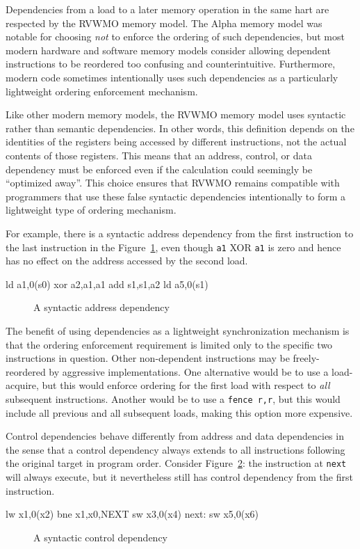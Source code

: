 Dependencies from a load to a later memory operation in the same hart are respected by the RVWMO memory model.
The Alpha memory model was notable for choosing {\em not} to enforce the ordering of such dependencies, but most modern hardware and software memory models consider allowing dependent instructions to be reordered too confusing and counterintuitive.
Furthermore, modern code sometimes intentionally uses such dependencies as a particularly lightweight ordering enforcement mechanism.

Like other modern memory models, the RVWMO memory model uses syntactic rather than semantic dependencies.
In other words, this definition depends on the identities of the
registers being accessed by different instructions, not the actual
contents of those registers.  This means that an address, control, or
data dependency must be enforced even if the calculation could seemingly
be ``optimized away''.
This choice ensures that RVWMO remains compatible with programmers that use these false syntactic dependencies intentionally to form a lightweight type of ordering mechanism.

For example, there is a syntactic address
dependency from the first instruction to the last instruction in the
Figure~\ref{fig:litmus:address}, even though {\tt a1} XOR {\tt a1} is zero and
hence has no effect on the address accessed by the second load.
\begin{verbbox}
ld  a1,0(s0)
xor a2,a1,a1
add s1,s1,a2
ld  a5,0(s1)
\end{verbbox}
\begin{figure}[h!]
  \centering\small
  \theverbbox
  \caption{A syntactic address dependency}
  \label{fig:litmus:address}
\end{figure}

The benefit of using dependencies as a lightweight synchronization mechanism is that the ordering enforcement requirement is limited only to the specific two instructions in question.
Other non-dependent instructions may be freely-reordered by aggressive implementations.
One alternative would be to use a load-acquire, but this would enforce ordering for the first load with respect to {\em all} subsequent instructions.
Another would be to use a {\tt fence r,r}, but this would include all previous and all subsequent loads, making this option more expensive.

Control dependencies behave differently from address and data dependencies in the sense that a control dependency always extends to all instructions following the original target in program order.
Consider Figure~\ref{fig:litmus:control1}: the instruction at {\tt next} will always execute, but it nevertheless still has control dependency from the first instruction.
\begin{verbbox}
      lw  x1,0(x2)
      bne x1,x0,NEXT
      sw  x3,0(x4)
next: sw  x5,0(x6)
\end{verbbox}
\begin{figure}[h!]
  \centering\small
  \theverbbox
  \caption{A syntactic control dependency}
  \label{fig:litmus:control1}
\end{figure}

